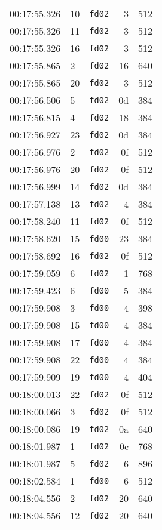\documentclass{article}
\begin{document}
\begin{longtable}{lllrr}
00:17:55.326 & 10 & \texttt{fd02} & 3 & 512 \\
00:17:55.326 & 11 & \texttt{fd02} & 3 & 512 \\
00:17:55.326 & 16 & \texttt{fd02} & 3 & 512 \\
00:17:55.865 & 2 & \texttt{fd02} & 16 & 640 \\
00:17:55.865 & 20 & \texttt{fd02} & 3 & 512 \\
00:17:56.506 & 5 & \texttt{fd02} & 0d & 384 \\
00:17:56.815 & 4 & \texttt{fd02} & 18 & 384 \\
00:17:56.927 & 23 & \texttt{fd02} & 0d & 384 \\
00:17:56.976 & 2 & \texttt{fd02} & 0f & 512 \\
00:17:56.976 & 20 & \texttt{fd02} & 0f & 512 \\
00:17:56.999 & 14 & \texttt{fd02} & 0d & 384 \\
00:17:57.138 & 13 & \texttt{fd02} & 4 & 384 \\
00:17:58.240 & 11 & \texttt{fd02} & 0f & 512 \\
00:17:58.620 & 15 & \texttt{fd00} & 23 & 384 \\
00:17:58.692 & 16 & \texttt{fd02} & 0f & 512 \\
00:17:59.059 & 6 & \texttt{fd02} & 1 & 768 \\
00:17:59.423 & 6 & \texttt{fd00} & 5 & 384 \\
00:17:59.908 & 3 & \texttt{fd00} & 4 & 398 \\
00:17:59.908 & 15 & \texttt{fd00} & 4 & 384 \\
00:17:59.908 & 17 & \texttt{fd00} & 4 & 384 \\
00:17:59.908 & 22 & \texttt{fd00} & 4 & 384 \\
00:17:59.909 & 19 & \texttt{fd00} & 4 & 404 \\
00:18:00.013 & 22 & \texttt{fd02} & 0f & 512 \\
00:18:00.066 & 3 & \texttt{fd02} & 0f & 512 \\
00:18:00.086 & 19 & \texttt{fd02} & 0a & 640 \\
00:18:01.987 & 1 & \texttt{fd02} & 0c & 768 \\
00:18:01.987 & 5 & \texttt{fd02} & 6 & 896 \\
00:18:02.584 & 1 & \texttt{fd00} & 6 & 512 \\
00:18:04.556 & 2 & \texttt{fd02} & 20 & 640 \\
00:18:04.556 & 12 & \texttt{fd02} & 20 & 640 \\

\end{longtable}
\end{document}
